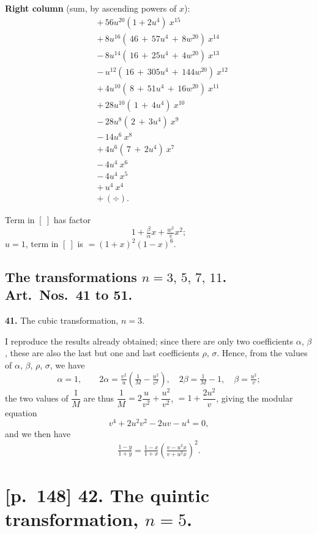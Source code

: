 \documentclass[11pt]{article}
\begin{document}
\noindent\textbf{Right column} (sum, by ascending powers of $x$):
\[
\begin{aligned}
&{+}\,56u^{20}(1+2u^4)\ x^{15}\\
&{+}\,8u^{16}(\,46\,+\,57u^4\,+\,8w^{20})\ x^{14}\\
&{-}\,8u^{14}(\,16\,+\,25u^4\,+\,4w^{20})\ x^{13}\\
&{-}\,u^{12}(\,16\,+\,305u^4\,+\,144w^{20})\ x^{12}\\
&{+}\,4u^{10}(\,8\,+\,51u^4\,+\,16w^{20})\ x^{11}\\
&{+}\,28u^{10}(\,1\,+\,4u^4)\ x^{10}\\
&{-}\,28u^{8}(\,2\,+\,3u^4)\ x^{9}\\
&{-}\,14u^{6}\ x^{8}\\
&{+}\,4u^{6}(\,7\,+\,2u^4)\ x^{7}\\
&{-}\,4u^{4}\ x^{6}\\
&{-}\,4u^{4}\ x^{5}\\
&{+}\,u^{4}\ x^{4}\\
&{+}\,(\div).
\end{aligned}
\]

\noindent Term in $[\ ]$ has factor
\[
1+\tfrac{\beta}{\alpha}x+\tfrac{w^2}{v}x^2;
\]
$u=1$, term in $[\ ]$ is $=(1+x)^2(1-x)^6$.

\subsection*{The transformations $n=3,\,5,\,7,\,11$. Art.\ Nos.\ 41 to 51.}

\noindent\textbf{41.} The cubic transformation, $n=3$.

I reproduce the results already obtained; since there are only two coefficients $\alpha$, $\beta$,
these are also the last but one and last coefficients $\rho$, $\sigma$. Hence, from the values of
$\alpha$, $\beta$, $\rho$, $\sigma$, we have
\[
\alpha=1,\qquad 2\alpha=\tfrac{v^2}{u}\!\left(\tfrac{1}{M}-\tfrac{u^2}{v^2}\right)\!,\quad 2\beta=\tfrac{1}{M}-1,\quad \beta=\tfrac{u^2}{v};
\]
the two values of $\dfrac{1}{M}$ are thus $\dfrac{1}{M}=2\dfrac{u}{v^2}+\dfrac{u^2}{v^2}$, $=1+\dfrac{2u^2}{v}$, giving the modular equation
\[
v^4+2u^2v^2-2uv-u^4=0,
\]
and we then have
\[
\tfrac{1-y}{1+y}=\tfrac{1-x}{1+x}\!\left(\tfrac{v-u^2x}{v+u^2x}\right)^{\!2}\!.
\]

\section*{[p.~148] \textbf{42.} The quintic transformation, $n=5$.}
\end{document}
